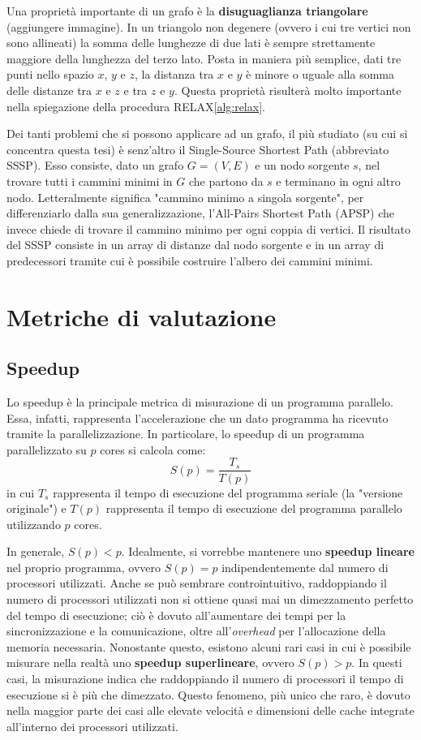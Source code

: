 \documentclass[12pt,a4paper]{book} %
\begin{document}
	Una proprietà importante di un grafo è la \textbf{disuguaglianza triangolare} (aggiungere immagine). In un triangolo non degenere (ovvero i cui tre vertici non sono allineati) la somma delle lunghezze di due lati è sempre strettamente maggiore della lunghezza del terzo lato. Posta in maniera più semplice, dati tre punti nello spazio $x$, $y$ e $z$, la distanza tra $x$ e $y$ è minore o uguale alla somma delle distanze tra $x$ e $z$ e tra $z$ e $y$. Questa proprietà risulterà molto importante nella spiegazione della procedura RELAX\ref{alg:relax}.
	
	Dei tanti problemi che si possono applicare ad un grafo, il più studiato (su cui si concentra questa tesi) è senz'altro il Single-Source Shortest Path (abbreviato SSSP). Esso consiste, dato un grafo $G=(V,E)$ e un nodo sorgente $s$, nel trovare tutti i cammini minimi in $G$ che partono da $s$ e terminano in ogni altro nodo. Letteralmente significa "cammino minimo a singola sorgente", per differenziarlo dalla sua generalizzazione, l'All-Pairs Shortest Path (APSP) che invece chiede di trovare il cammino minimo per ogni coppia di vertici. Il risultato del SSSP consiste in un array di distanze dal nodo sorgente e in un array di predecessori tramite cui è possibile costruire l'albero dei cammini minimi.
	
	\chapter{Metriche di valutazione}
	\label{section:metriche}
	\section{Speedup}
	Lo speedup è la principale metrica di misurazione di un programma parallelo. Essa, infatti, rappresenta l'accelerazione che un dato programma ha ricevuto tramite la parallelizzazione. In particolare, lo speedup di un programma parallelizzato su $p$ cores si calcola come:
	\begin{equation}
		S(p) = \frac{T_s}{T(p)}
		\label{eq:speedup}
	\end{equation}
	in cui $T_s$ rappresenta il tempo di esecuzione del programma seriale (la "versione originale") e $T(p)$ rappresenta il tempo di esecuzione del programma parallelo utilizzando $p$ cores.
	
	In generale, $S(p) < p$. Idealmente, si vorrebbe mantenere uno \textbf{speedup lineare} nel proprio programma, ovvero $S(p) = p$ indipendentemente dal numero di processori utilizzati. Anche se può sembrare controintuitivo, raddoppiando il numero di processori utilizzati non si ottiene quasi mai un dimezzamento perfetto del tempo di esecuzione; ciò è dovuto all'aumentare dei tempi per la sincronizzazione e la comunicazione, oltre all'\textit{overhead} per l'allocazione della memoria necessaria. Nonostante questo, esistono alcuni rari casi in cui è possibile misurare nella realtà uno \textbf{speedup superlineare}, ovvero $S(p) > p$. In questi casi, la misurazione indica che raddoppiando il numero di processori il tempo di esecuzione si è più che dimezzato. Questo fenomeno, più unico che raro, è dovuto nella maggior parte dei casi alle elevate velocità e dimensioni delle cache integrate all'interno dei processori utilizzati.
	
\end{document}
